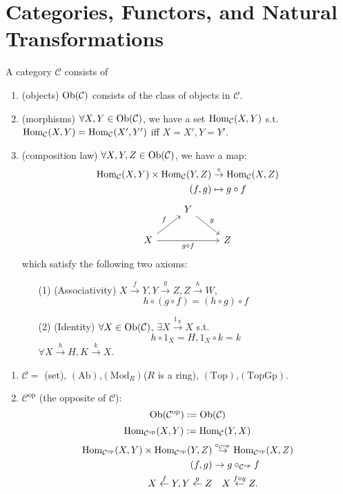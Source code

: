 \section{Categories, Functors, and Natural Transformations}
\begin{definition}[categories]
   A category $\mathcal{C}$ consists of 
   \begin{enumerate}
     \item (objects) $\operatorname{Ob}(\mathcal{C})$ consists of the class of objects in $\mathcal{C}$.
     \item (morphisms) $\forall X,Y \in  \operatorname{Ob}(\mathcal{C)}$, we have a set 
       $\operatorname{Hom}_{\mathcal{C}}(X,Y)$ s.t. $\operatorname{Hom}_{\mathcal{C}}(X,Y)=\operatorname{Hom}_{\mathcal{C}}(X',Y')$ iff $X=X',Y=Y'$.
     \item (composition law)  $\forall X,Y,Z \in \operatorname{Ob}(\mathcal{C})$, we have a map:
       \begin{align*}
	\operatorname{Hom}_{\mathcal{C}}(X,Y)\times \operatorname{Hom}_{\mathcal{C}}(Y,Z)&\overset{\circ}{\to}\operatorname{Hom}_{\mathcal{C}}(X,Z)\\
	(f,g)&\mapsto  g\circ f
	     \end{align*}
	     \[
	     \begin{tikzcd}
	       &  Y\arrow{rd}{g} & \\
	       X\arrow{ru}{f} \arrow[swap]{rr}{g\circ f} & & Z
	     \end{tikzcd}
	     \]
	     which satisfy the following two axioms:
	     \begin{itemize}
	       \item [(1)](Associativity) $X\overset{f}{\to}Y,Y\overset{g}{\to}Z,Z\overset{h}{\to}W$,
		  \[
		    h\circ(g\circ f)=(h\circ g)\circ f
		 \] 
	       \item [(2)](Identity) $\forall X\in \operatorname{Ob}(\mathcal{C})$, $\exists X\overset{1_X}{\to}X$ s.t. 
		  \[
		 h\circ 1_X=H, 1_X\circ k=k
		 \] 
		 $\forall X\overset{h}{\to}H,K\overset{k}{\to}X$.
		 
	     \end{itemize}
   \end{enumerate}
 \end{definition}
 \begin{example}
\begin{enumerate}
  \item 
   $\mathcal{C}=$ (set), $(\text{Ab})$,$(\text{Mod}_R)$($R$ is a ring), $(\text{Top})$,$(\text{TopGp})$.
 \item $\mathcal{C}^{\text{op}}$ (the opposite of $\mathcal{C}$):
   \[
     \operatorname{Ob}(\mathcal{C}^{\text{op}}):=\operatorname{Ob}(\mathcal{C})
   \] 
   \[
     \operatorname{Hom}_{\mathcal{C}^{\text{op}}}(X,Y):=\operatorname{Hom}_{\mathcal{C}}(Y,X)
   \] 
   \begin{align*}
     \operatorname{Hom}_{\mathcal{C}^{\text{op}}}(X,Y)\times \operatorname{Hom}_{\mathcal{C}^{\text{op}}}(Y,Z)&\overset{\circ_{\mathcal{C}^{\text{op}}}}{\to}\operatorname{Hom}_{\mathcal{C}^{\text{op}}}(X,Z)\\
     (f,g)&\to g\circ_{\mathcal{C}^{\text{op}}} f\\
     X\overset{f}{\gets}Y,Y\overset{g}{\gets}Z &\quad X\overset{f\circ g}{\gets}Z
   .\end{align*}
   
\end{enumerate}
 \end{example}
